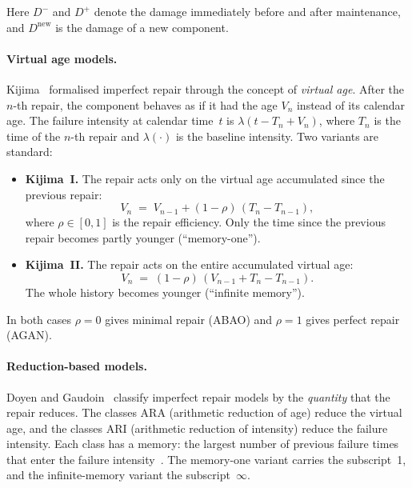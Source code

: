 \documentclass[11pt,a4paper]{article}
\theoremstyle{plain}
\theoremstyle{definition}
\theoremstyle{remark}
\begin{document}
\noindent Here $D^-$ and $D^+$ denote the damage immediately before and after maintenance, and $D^{\mathrm{new}}$ is the damage of a new component.

\paragraph{Virtual age models.}

Kijima~\cite{Kijima1989} formalised imperfect repair through the concept of \emph{virtual age}.
After the $n$-th repair, the component behaves as if it had the age $V_n$ instead of its calendar age.
The failure intensity at calendar time~$t$ is $\lambda(t - T_n + V_n)$, where $T_n$ is the time of the $n$-th repair and $\lambda(\cdot)$ is the baseline intensity.
Two variants are standard:
\begin{itemize}
  \item \textbf{Kijima~I.} The repair acts only on the virtual age accumulated since the previous repair:
    \begin{equation}
      V_n \;=\; V_{n-1} + (1-\rho)\,(T_n - T_{n-1}),
    \end{equation}
    where $\rho \in [0,1]$ is the repair efficiency.
    Only the time since the previous repair becomes partly younger (``memory-one'').
  \item \textbf{Kijima~II.} The repair acts on the entire accumulated virtual age:
    \begin{equation}
      V_n \;=\; (1-\rho)\,(V_{n-1} + T_n - T_{n-1}).
    \end{equation}
    The whole history becomes younger (``infinite memory'').
\end{itemize}
In both cases $\rho = 0$ gives minimal repair (ABAO) and $\rho = 1$ gives perfect repair (AGAN).

\paragraph{Reduction-based models.}

Doyen and Gaudoin~\cite{DoyenGaudoin2004} classify imperfect repair models by the \emph{quantity} that the repair reduces.
The classes ARA (arithmetic reduction of age) reduce the virtual age, and the classes ARI (arithmetic reduction of intensity) reduce the failure intensity.
Each class has a memory: the largest number of previous failure times that enter the failure intensity~\cite[p.~8]{DoyenGaudoin2004}.
The memory-one variant carries the subscript~1, and the infinite-memory variant the subscript~$\infty$.
\end{document}
